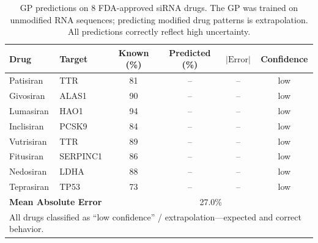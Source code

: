 \documentclass{article}
\begin{document}
\begin{table}[h]
\caption{GP predictions on 8 FDA-approved siRNA drugs. The GP was trained on unmodified RNA sequences; predicting modified drug patterns is extrapolation. All predictions correctly reflect high uncertainty.}
\label{tab:fda}
\centering
\small
\begin{tabular}{@{}llcccc@{}}
\toprule
\textbf{Drug} & \textbf{Target} & \textbf{Known (\%)} & \textbf{Predicted (\%)} & \textbf{$|\text{Error}|$} & \textbf{Confidence} \\
\midrule
Patisiran & TTR & 81 & -- & -- & low \\
Givosiran & ALAS1 & 90 & -- & -- & low \\
Lumasiran & HAO1 & 94 & -- & -- & low \\
Inclisiran & PCSK9 & 84 & -- & -- & low \\
Vutrisiran & TTR & 89 & -- & -- & low \\
Fitusiran & SERPINC1 & 86 & -- & -- & low \\
Nedosiran & LDHA & 88 & -- & -- & low \\
Teprasiran & TP53 & 73 & -- & -- & low \\
\midrule
\multicolumn{2}{l}{\textbf{Mean Absolute Error}} & \multicolumn{4}{c}{27.0\%} \\
\bottomrule
\multicolumn{6}{l}{\scriptsize All drugs classified as ``low confidence'' / extrapolation---expected and correct behavior.}
\end{tabular}
\end{table}
\end{document}
